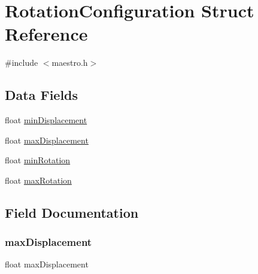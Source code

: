 \hypertarget{struct_rotation_configuration}{}\section{Rotation\+Configuration Struct Reference}
\label{struct_rotation_configuration}


{\ttfamily \#include $<$maestro.\+h$>$}

\subsection*{Data Fields}
\begin{DoxyCompactItemize}
\item 
float \hyperlink{struct_rotation_configuration_a7ffb8de9d12db685a3fa2395514b19b6}{min\+Displacement}
\item 
float \hyperlink{struct_rotation_configuration_ab28f784a26ca9d2ce7d7a785b158aa61}{max\+Displacement}
\item 
float \hyperlink{struct_rotation_configuration_a1b43754bfd8f4ed8d4b0fffd628dc9bc}{min\+Rotation}
\item 
float \hyperlink{struct_rotation_configuration_a149438ba09e1031330db57c64b5d2ca0}{max\+Rotation}
\end{DoxyCompactItemize}


\subsection{Field Documentation}
\mbox{\label{struct_rotation_configuration_ab28f784a26ca9d2ce7d7a785b158aa61}} 
\subsubsection{\texorpdfstring{max\+Displacement}{maxDisplacement}}
{\footnotesize\ttfamily float max\+Displacement}

\mbox{\label{struct_rotation_configuration_a149438ba09e1031330db57c64b5d2ca0}} 
